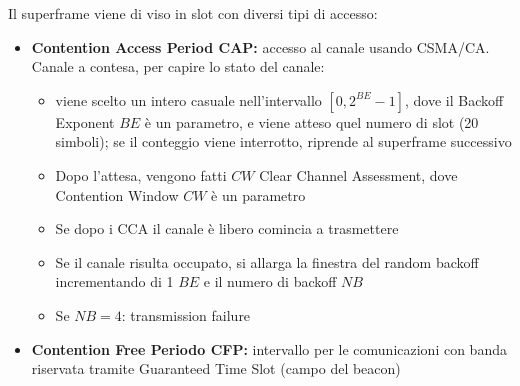 Il superframe viene di viso in slot con diversi tipi di accesso: 
\begin{itemize}
    \item \textbf{Contention Access Period CAP:} accesso al canale usando CSMA/CA. Canale a contesa, per capire lo stato del canale: 
    \begin{itemize}
        \item viene scelto un intero casuale nell'intervallo $[0, 2^{BE} - 1]$, dove il Backoff Exponent $BE$ è un parametro, e viene atteso quel numero di slot (20 simboli); se il conteggio viene interrotto, riprende al superframe successivo
        
        \item Dopo l'attesa, vengono fatti $CW$ Clear Channel Assessment, dove Contention Window $CW$ è un parametro
        
        \item Se dopo i CCA il canale è libero comincia a trasmettere
        
        \item Se il canale risulta occupato, si allarga la finestra del random backoff incrementando di 1 $BE$ e il numero di backoff $NB$
        
        \item Se $NB = 4$: transmission failure
    \end{itemize}
    
    \item \textbf{Contention Free Periodo CFP:} intervallo per le comunicazioni con banda riservata tramite Guaranteed Time Slot (campo del beacon)
\end{itemize}